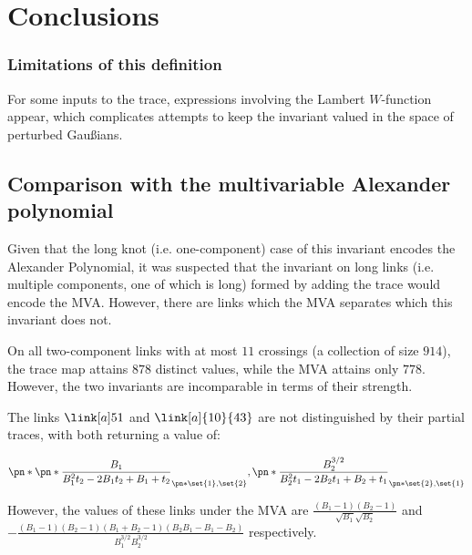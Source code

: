 \chapter{Conclusions}\label{ch:conclusions}

\subsection{Limitations of this definition}\label{sec:limitations}
For some inputs to the trace, expressions involving the Lambert $W$-function
appear, which complicates attempts to keep the invariant valued in the space of
perturbed Gaußians.

\section{Comparison with the multivariable Alexander polynomial}
\label{sec:compare_MVA}

Given that the long knot (i.e. one-component) case of this invariant
encodes the Alexander Polynomial, it was suspected that the invariant on long
links (i.e. multiple components, one of which is long) formed by adding the
trace would encode the \ac{MVA}. However, there are links which the \ac{MVA}
separates which this invariant does not.

On all two-component links with at most $11$ crossings (a collection of size
$914$), the trace map attains $878$ distinct values, while the MVA attains only
$778$. However, the two invariants are incomparable in terms of their strength.

The links $\link[a]51$ and $\link[a]{10}{43}$ are not distinguished by their
partial traces, with both returning a value of:

\begin{equation}
        \pn*{
                \pn*{
                        \frac{B_1}{B_1^2 t_2 -2 B_1 t_2 +B_1+t_2}
                }_{\pn*{\set{1},\set{2}}},
                \pn*{
                        \frac{B_2^{3/2}}{B_2^2 t_1 -2 B_2 t_1 +B_2+t_1}
                }_{\pn*{\set{2},\set{1}}}
}
\end{equation}

However, the values of these links under the \ac{MVA} are
$\frac{\left(B_1-1\right) \left(B_2-1\right)}{\sqrt{B_1} \sqrt{B_2}}
$ and $-\frac{\left(B_1-1\right) \left(B_2-1\right) \left(B_1+B_2-1\right)
        \left(B_2 B_1-B_1-B_2\right)}{B_1^{3/2} B_2^{3/2}}$ respectively.

